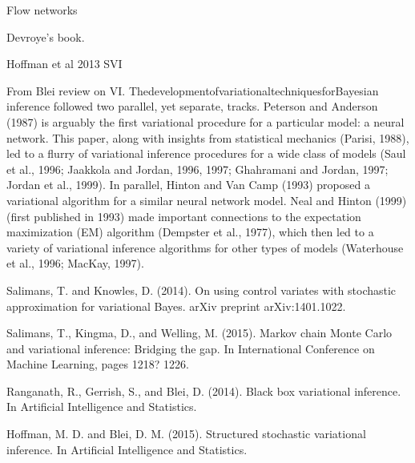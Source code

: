 \documentclass{article}
\begin{document}
Flow networks

Devroye's book.

Hoffman et al 2013 SVI 


From Blei review on VI.
ThedevelopmentofvariationaltechniquesforBayesian inference followed two parallel, yet separate, tracks. Peterson and Anderson (1987) is arguably the first variational procedure for a particular model: a neural network. This paper, along with insights from statistical mechanics (Parisi, 1988), led to a flurry of variational inference procedures for a wide class of models (Saul et al., 1996; Jaakkola and Jordan, 1996, 1997; Ghahramani and Jordan, 1997; Jordan et al., 1999). In parallel, Hinton and Van Camp (1993) proposed a variational algorithm for a similar neural network model. Neal and Hinton (1999) (first published in 1993) made important connections to the expectation maximization (EM) algorithm (Dempster et al., 1977), which then led to a variety of variational inference algorithms for other types of models (Waterhouse et al., 1996; MacKay, 1997).

Salimans, T. and Knowles, D. (2014). On using control variates with stochastic approximation for variational Bayes. arXiv preprint arXiv:1401.1022.

Salimans, T., Kingma, D., and Welling, M. (2015). Markov chain Monte Carlo and variational inference: Bridging the gap. In International Conference on Machine Learning, pages 1218? 1226.

Ranganath, R., Gerrish, S., and Blei, D. (2014). Black box variational inference. In Artificial
Intelligence and Statistics.

Hoffman, M. D. and Blei, D. M. (2015). Structured stochastic variational inference. In Artificial Intelligence and Statistics.
\end{document}
